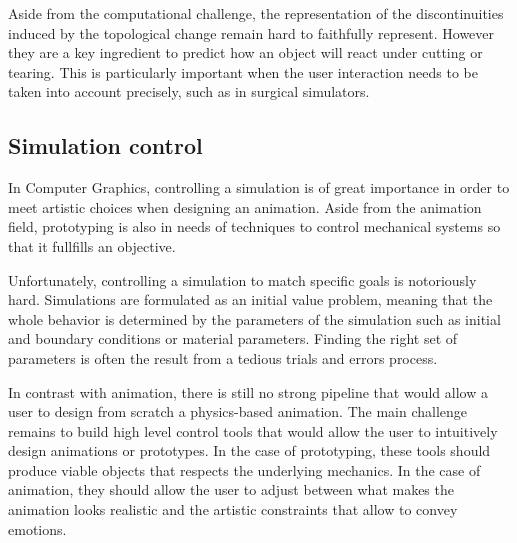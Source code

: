 Aside from the computational challenge, the representation of the discontinuities induced by the topological change remain hard to faithfully represent. However they are a key ingredient to predict how an object will react under cutting or tearing. This is particularly important when the user interaction needs to be taken into account precisely, such as in surgical simulators.

\subsection{Simulation control}

In Computer Graphics, controlling a simulation is of great importance in order to meet artistic choices when designing an animation. Aside from the animation field, prototyping is also in needs of techniques to control mechanical systems so that it fullfills an objective.

Unfortunately, controlling a simulation to match specific goals is notoriously hard. Simulations are formulated as an initial value problem, meaning that the whole behavior is determined by the parameters of the simulation such as initial and boundary conditions or material parameters. Finding the right set of parameters is often the result from a tedious trials and errors process.

In contrast with animation, there is still no strong pipeline that would allow a user to design from scratch a physics-based animation. The main challenge remains to build high level control tools that would allow the user to intuitively design animations or prototypes. In the case of prototyping, these tools should produce viable objects that respects the underlying mechanics. In the case of animation, they should allow the user to adjust between what makes the animation looks realistic and the artistic constraints that allow to convey emotions. 

